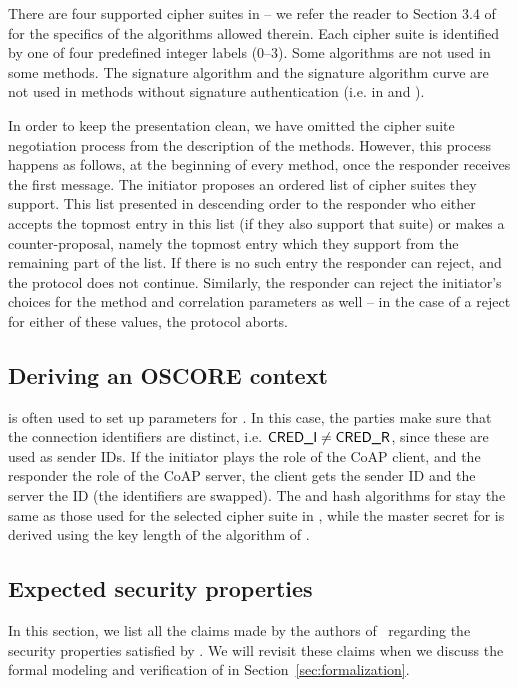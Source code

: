 {There are four supported cipher suites in \mEdhoc{} -- we refer the reader to Section 3.4 of~\cite{selander-lake-edhoc-01} for the specifics of the algorithms allowed therein. Each cipher suite is identified by one of four predefined integer labels (0--3). Some algorithms are not used in some methods.  The signature algorithm and the signature algorithm curve are not used in methods without signature authentication (i.e. in \mPskPsk{} and \mStatStat).

In order to keep the presentation clean, we have omitted the cipher suite negotiation process from the description of the methods. However, this process happens as follows, at the beginning of every method, once the responder receives the first message. The initiator proposes an ordered list of cipher suites they support. This list presented in descending order to the responder who either accepts the topmost entry in this list (if they also support that suite) or makes a counter-proposal, namely the topmost entry which they support from the remaining part of the list. If there is no such entry the responder can reject, and the protocol does not continue. Similarly, the responder can reject the initiator's choices for the method and correlation parameters as well -- in the case of a reject for either of these values, the protocol aborts.


\subsection{Deriving an OSCORE context}
\mEdhoc{} is often used to set up parameters for \mOscore. In this case, the
parties make sure that the connection identifiers are distinct, i.e. $\text{\textup{\textsf{CRED\_I}}}
\neq \text{\textup{\textsf{CRED\_R}}}$, since these are used as \mOscore{} sender IDs. If the initiator
plays the role of the CoAP client, and the responder the role of the CoAP
server, the client gets the sender ID \mCredr{} and the server the ID \mCredi{} (the identifiers are swapped). The \mAead{} and hash algorithms for \mOscore{} stay the same as those used for the selected cipher suite in \mEdhoc, while the master secret for \mOscore{} is derived using the key length of the \mAead{} algorithm of \mEdhoc. 

\subsection{Expected security properties}
In this section, we list all the claims made by the authors of~\cite{selander-lake-edhoc-01} regarding the security properties satisfied by \mEdhoc. We will revisit these claims when we discuss the formal modeling and verification of \mEdhoc{} in Section~\ref{sec:formalization}. 

}
